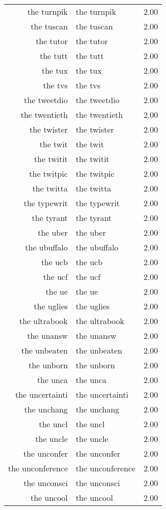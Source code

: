 \begin{table}[ht]
\begin{tabular}{rlr}
  the turnpik & the turnpik & 2.00 \\ 
  the tuscan & the tuscan & 2.00 \\ 
  the tutor & the tutor & 2.00 \\ 
  the tutt & the tutt & 2.00 \\ 
  the tux & the tux & 2.00 \\ 
  the tvs & the tvs & 2.00 \\ 
  the tweetdio & the tweetdio & 2.00 \\ 
  the twentieth & the twentieth & 2.00 \\ 
  the twister & the twister & 2.00 \\ 
  the twit & the twit & 2.00 \\ 
  the twitit & the twitit & 2.00 \\ 
  the twitpic & the twitpic & 2.00 \\ 
  the twitta & the twitta & 2.00 \\ 
  the typewrit & the typewrit & 2.00 \\ 
  the tyrant & the tyrant & 2.00 \\ 
  the uber & the uber & 2.00 \\ 
  the ubuffalo & the ubuffalo & 2.00 \\ 
  the ucb & the ucb & 2.00 \\ 
  the ucf & the ucf & 2.00 \\ 
  the ue & the ue & 2.00 \\ 
  the uglies & the uglies & 2.00 \\ 
  the ultrabook & the ultrabook & 2.00 \\ 
  the unansw & the unansw & 2.00 \\ 
  the unbeaten & the unbeaten & 2.00 \\ 
  the unborn & the unborn & 2.00 \\ 
  the unca & the unca & 2.00 \\ 
  the uncertainti & the uncertainti & 2.00 \\ 
  the unchang & the unchang & 2.00 \\ 
  the uncl & the uncl & 2.00 \\ 
  the uncle & the uncle & 2.00 \\ 
  the unconfer & the unconfer & 2.00 \\ 
  the unconference & the unconference & 2.00 \\ 
  the unconsci & the unconsci & 2.00 \\ 
  the uncool & the uncool & 2.00 \\ 

\end{tabular}
\end{table}
